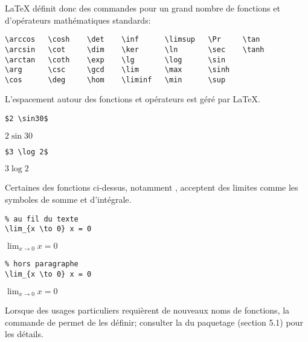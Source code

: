 {\LaTeX} définit donc des commandes pour un grand nombre de fonctions
et d'opérateurs mathématiques standards:
\begin{lstlisting}
\arccos   \cosh    \det    \inf      \limsup   \Pr     \tan
\arcsin   \cot     \dim    \ker      \ln       \sec    \tanh
\arctan   \coth    \exp    \lg       \log      \sin
\arg      \csc     \gcd    \lim      \max      \sinh
\cos      \deg     \hom    \liminf   \min      \sup
\end{lstlisting}
L'espacement autour des fonctions et opérateurs est géré par {\LaTeX}.
\begin{demo}
  \begin{minipage}{0.45\linewidth}
    \begin{texample}
\begin{lstlisting}
$2 \sin30$
\end{lstlisting}
      \producing
      $2 \sin30$
    \end{texample}
  \end{minipage}
  \hfill
  \begin{minipage}{0.45\linewidth}
    \begin{texample}
\begin{lstlisting}
$3 \log 2$
\end{lstlisting}
      \producing
      $3 \log 2$
    \end{texample}
  \end{minipage}
\end{demo}

Certaines des fonctions ci-dessus, notamment \cmd{\lim}, acceptent des
limites comme les symboles de somme et d'intégrale.
\begin{demo}
  \begin{texample}
\begin{lstlisting}
% au fil du texte
\lim_{x \to 0} x = 0
\end{lstlisting}
    \producing $\lim_{x \to 0} x = 0$
  \end{texample}

  \begin{texample}
\begin{lstlisting}
% hors paragraphe
\lim_{x \to 0} x = 0
\end{lstlisting}
    \producing $\displaystyle \lim_{x \to 0} x = 0$
  \end{texample}
\end{demo}

Lorsque des usages particuliers requièrent de nouveaux noms de
fonctions, la commande \cmd{\DeclareMathOperator} de 
permet de les définir; consulter la %
du paquetage (section 5.1) pour les détails.


